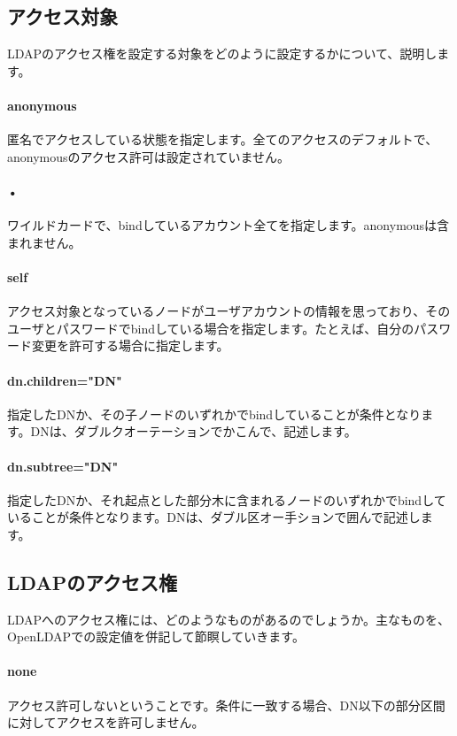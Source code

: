 \subsection{アクセス対象}

LDAPのアクセス権を設定する対象をどのように設定するかについて、説明します。

\paragraph{anonymous}
匿名でアクセスしている状態を指定します。全てのアクセスのデフォルトで、anonymousのアクセス許可は設定されていません。

\paragraph{•}
ワイルドカードで、bindしているアカウント全てを指定します。anonymousは含まれません。

\paragraph{self}
アクセス対象となっているノードがユーザアカウントの情報を思っており、そのユーザとパスワードでbindしている場合を指定します。たとえば、自分のパスワード変更を許可する場合に指定します。

\paragraph{dn.children="DN"}
指定したDNか、その子ノードのいずれかでbindしていることが条件となります。DNは、ダブルクオーテーションでかこんで、記述します。

\paragraph{dn.subtree="DN"}
指定したDNか、それ起点とした部分木に含まれるノードのいずれかでbindしていることが条件となります。DNは、ダブル区オー手ションで囲んで記述します。

\subsection{LDAPのアクセス権}

LDAPへのアクセス権には、どのようなものがあるのでしょうか。主なものを、OpenLDAPでの設定値を併記して節瞑していきます。

\paragraph{none}
アクセス許可しないということです。条件に一致する場合、DN以下の部分区間に対してアクセスを許可しません。

